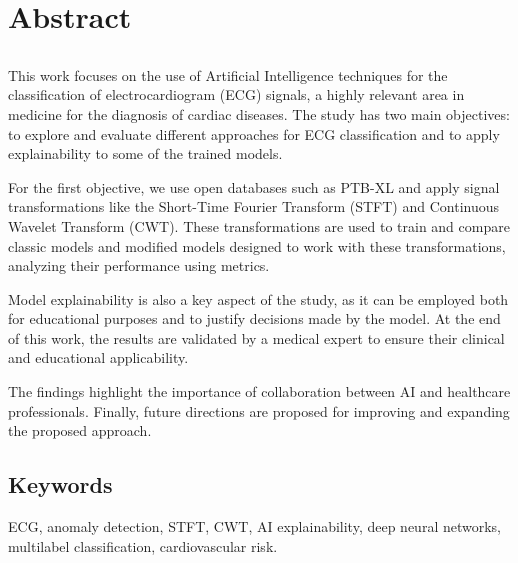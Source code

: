 \chapter*{Abstract}

\section*{\tituloPortadaEngVal}

This work focuses on the use of Artificial Intelligence techniques for the classification of electrocardiogram (ECG) signals, a highly relevant area in medicine for the diagnosis of cardiac diseases. The study has two main objectives: to explore and evaluate different approaches for ECG classification and to apply explainability to some of the trained models.

For the first objective, we use open databases such as PTB-XL and apply signal transformations like the Short-Time Fourier Transform (STFT) and Continuous Wavelet Transform (CWT). These transformations are used to train and compare classic models and modified models designed to work with these transformations, analyzing their performance using metrics.

Model explainability is also a key aspect of the study, as it can be employed both for educational purposes and to justify decisions made by the model. At the end of this work, the results are validated by a medical expert to ensure their clinical and educational applicability.

The findings highlight the importance of collaboration between AI and healthcare professionals. Finally, future directions are proposed for improving and expanding the proposed approach.

\section*{Keywords}

ECG, anomaly detection, STFT, CWT, AI explainability, deep neural networks, multilabel classification, cardiovascular risk.

